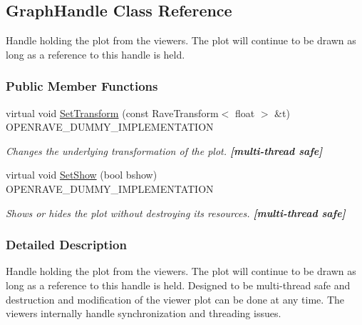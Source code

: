 \hypertarget{classOpenRAVE_1_1GraphHandle}{
\subsection{GraphHandle Class Reference}
\label{classOpenRAVE_1_1GraphHandle}
}


Handle holding the plot from the viewers. The plot will continue to be drawn as long as a reference to this handle is held.  


\subsubsection*{Public Member Functions}
\begin{DoxyCompactItemize}
\item 
virtual void \hyperlink{classOpenRAVE_1_1GraphHandle_a1e4f3343130d6f10fba4b13f3be3913d}{SetTransform} (const RaveTransform$<$ float $>$ \&t) OPENRAVE\_\-DUMMY\_\-IMPLEMENTATION
\begin{DoxyCompactList}\small\item\em Changes the underlying transformation of the plot. {\bfseries \mbox{[}multi-\/thread safe\mbox{]}} \item\end{DoxyCompactList}\item 
\hypertarget{classOpenRAVE_1_1GraphHandle_a5f9250c51a292ef2849ed651b59d27e4}{
virtual void \hyperlink{classOpenRAVE_1_1GraphHandle_a5f9250c51a292ef2849ed651b59d27e4}{SetShow} (bool bshow) OPENRAVE\_\-DUMMY\_\-IMPLEMENTATION}
\label{classOpenRAVE_1_1GraphHandle_a5f9250c51a292ef2849ed651b59d27e4}

\begin{DoxyCompactList}\small\item\em Shows or hides the plot without destroying its resources. {\bfseries \mbox{[}multi-\/thread safe\mbox{]}} \item\end{DoxyCompactList}\end{DoxyCompactItemize}


\subsubsection{Detailed Description}
Handle holding the plot from the viewers. The plot will continue to be drawn as long as a reference to this handle is held. Designed to be multi-\/thread safe and destruction and modification of the viewer plot can be done at any time. The viewers internally handle synchronization and threading issues. 

